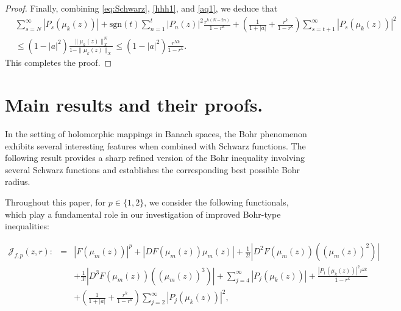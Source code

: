 \documentclass[11pt, reqno]{amsart}
\newtheorem*{cor A}{Corollary A}
\newtheorem*{cor B}{Corollary B}
\newcommand{\bea}{\begin{eqnarray}}
\newcommand{\eea}{\end{eqnarray}}
\numberwithin{equation}{section}
\begin{document}
\begin{proof}
Finally, combining \eqref{eq:Schwarz}, \eqref{hhh1}, and \eqref{aq1}, we deduce that
\begin{align*}
&\sum_{s=N}^{\infty}|P_s(\mu_k(z))|
+\text{sgn}(t)\sum_{n=1}^t|P_n(z)|^2\frac{r^{k(N-2n)}}{1-r^k}
+\left(\frac{1}{1+|a|}
+\frac{r^k}{1-r^k}\right)
\sum_{s=t+1}^{\infty}|P_s(\mu_k(z))|^2
\\
&\le
(1-|a|^2)
\frac{\|\mu_k(z)\|_X^N}
     {1-\|\mu_k(z)\|_X}
\le
(1-|a|^2)\frac{r^{Nk}}{1-r^k}.
\end{align*}
This completes the proof.
\end{proof}
\section{{\bf Main results and their proofs.}}
In the setting of holomorphic mappings in Banach spaces, the Bohr phenomenon exhibits several interesting features when combined with Schwarz functions. The following result provides a sharp refined version of the Bohr inequality involving several Schwarz functions and establishes the corresponding best possible Bohr radius.

Throughout this paper, for $p\in \{1,2\}$, we consider the following functionals, which play a fundamental role in our investigation of improved Bohr-type inequalities:

\bea\label{T1.1}\mathcal{J}_{f,p}(z,r):&=&|F(\mu_m(z))|^p+|D F(\mu_m(z))\mu_m(z)|+\frac{1}{2!}|D^2 F(\mu_m(z)) ((\mu_m(z))^2)|\nonumber\\
&&+\frac{1}{3!}|D^3 F(\mu_m(z)) ((\mu_m(z))^3)|+\sum_{j=4}^{\infty} |P_j(\mu_k(z))| +\frac{|P_1(\mu_k(z))|^2r^{2k}}{1-r^k}\nonumber\\
&&+\left(\frac{1}{1+|a|}+\frac{r^k}{1-r^k}\right)
\sum_{j=2}^{\infty} |P_j(\mu_k(z))|^2,
\eea
\end{document}
